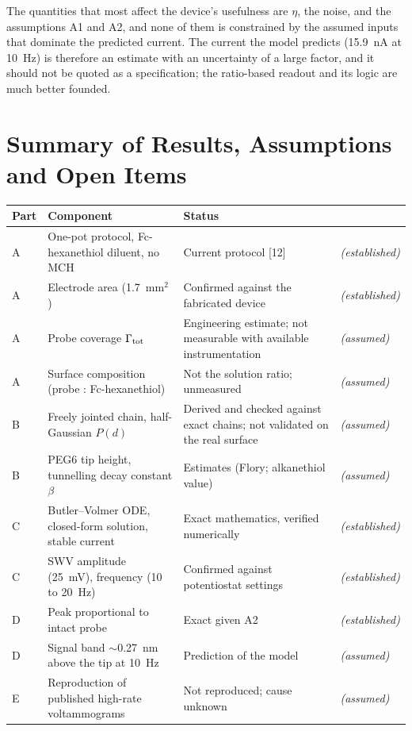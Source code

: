 \documentclass[10pt,a4paper]{article}
\numberwithin{equation}{section}
\newcommand{\cit}[1]{[#1]}
\newcommand{\Grtot}{\Gamma_{\rm tot}}
\newcommand{\FLAG}{\textit{(assumed)}}
\newcommand{\CONF}{\textit{(established)}}
\newcommand{\dStarTenOff}{0.27}
\newcommand{\peakNA}{15.9}
\begin{document}
The quantities that most affect the device's usefulness are $\eta$, the noise, and the assumptions A1 and A2, and
none of them is constrained by the assumed inputs that dominate the predicted current. The current the
model predicts (\peakNA~nA at 10~Hz) is therefore an estimate with an uncertainty of a large
factor, and it should not be quoted as a specification; the ratio-based readout and its logic are much
better founded.

\section{Summary of Results, Assumptions and Open Items}
\label{sec:summary}

\begin{center}
\small\renewcommand{\arraystretch}{1.3}
\begin{tabular}{@{}p{0.9cm}p{4.6cm}p{8.3cm}l@{}}
\toprule
\textbf{Part} & \textbf{Component} & \textbf{Status} & \\
\midrule
A & One-pot protocol, Fc-hexanethiol diluent, no MCH & Current protocol \cit{12} & \CONF \\
A & Electrode area (1.7~mm$^2$) & Confirmed against the fabricated device & \CONF \\
A & Probe coverage $\Grtot$ & Engineering estimate; not measurable with available instrumentation & \FLAG \\
A & Surface composition (probe : Fc-hexanethiol) & Not the solution ratio; unmeasured & \FLAG \\
B & Freely jointed chain, half-Gaussian $P(d)$ & Derived and checked against exact chains; not validated on the real surface & \FLAG \\
B & PEG6 tip height, tunnelling decay constant $\beta$ & Estimates (Flory; alkanethiol value) & \FLAG \\
C & Butler--Volmer ODE, closed-form solution, stable current & Exact mathematics, verified numerically & \CONF \\
C & SWV amplitude (25~mV), frequency (10 to 20~Hz) & Confirmed against potentiostat settings & \CONF \\
D & Peak proportional to intact probe & Exact given A2 & \CONF \\
D & Signal band $\sim$\dStarTenOff~nm above the tip at 10~Hz & Prediction of the model & \FLAG \\
E & Reproduction of published high-rate voltammograms & Not reproduced; cause unknown & \FLAG \\

\end{tabular}
\end{center}
\end{document}
